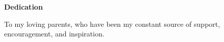 
\begin{center}
\textbf{\Large{Dedication}}
\end{center}
\vspace{5cm}
\begin{center}
    To my loving parents, who have been my constant source of support, encouragement, and inspiration.
\end{center}
\newpage